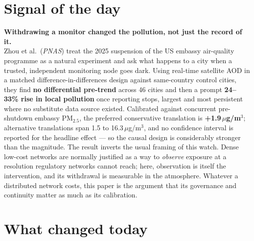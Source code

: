 \documentclass[10pt]{article}
\begin{document}
\vspace{6mm}

\section*{\sffamily\bfseries\color{Deep}Signal of the day}
\vspace{-1.5mm}{\color{Amber}\rule{\linewidth}{1.1pt}}\vspace{2.5mm}

\begin{keybox}
{\sffamily\bfseries\small\color{Deep}Withdrawing a monitor changed the pollution, not just
the record of it.}\\[1.4mm]
\footnotesize
Zhou et al.\ (\textit{PNAS}) treat the 2025 suspension of the US embassy air-quality
programme as a natural experiment and ask what happens to a city when a trusted,
independent monitoring node goes dark. Using real-time satellite AOD in a matched
difference-in-differences design against same-country control cities, they find
\textbf{no differential pre-trend} across 46 cities and then a prompt
\textbf{24--33\% rise in local pollution} once reporting stops, largest and most
persistent where no substitute data source existed. Calibrated against concurrent
pre-shutdown embassy PM$_{2.5}$, the preferred conservative translation is
\textbf{+1.9\,$\mu$g/m$^3$}; alternative translations span 1.5 to
16.3\,$\mu$g/m$^3$, and no confidence interval is reported for the headline effect ---
so the causal design is considerably stronger than the magnitude. The result inverts
the usual framing of this watch. Dense low-cost networks are normally justified as a
way to \emph{observe} exposure at a resolution regulatory networks cannot reach; here,
observation is itself the intervention, and its withdrawal is measurable in the
atmosphere. Whatever a distributed network costs, this paper is the argument that its
governance and continuity matter as much as its calibration.
\end{keybox}

\vspace{3mm}

\section*{\sffamily\bfseries\color{Deep}What changed today}
\vspace{-1.5mm}{\color{Amber}\rule{\linewidth}{1.1pt}}\vspace{2.5mm}
\end{document}
